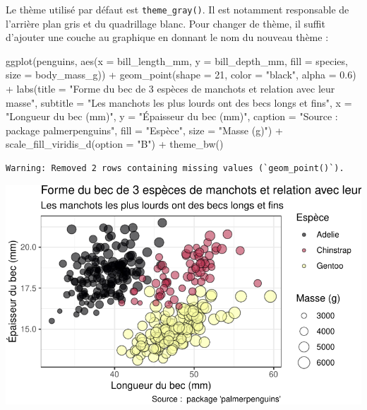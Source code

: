 \documentclass[
  a4paper,
  DIV=11,
  numbers=noendperiod,
  oneside]{scrreprt}
\newenvironment{Shaded}{}{}
\newcommand{\AttributeTok}[1]{\textcolor[rgb]{0.84,0.23,0.29}{#1}}
\newcommand{\DecValTok}[1]{\textcolor[rgb]{0.00,0.36,0.77}{#1}}
\newcommand{\FloatTok}[1]{\textcolor[rgb]{0.00,0.36,0.77}{#1}}
\newcommand{\FunctionTok}[1]{\textcolor[rgb]{0.44,0.26,0.76}{#1}}
\newcommand{\NormalTok}[1]{\textcolor[rgb]{0.14,0.16,0.18}{#1}}
\newcommand{\SpecialCharTok}[1]{\textcolor[rgb]{0.00,0.36,0.77}{#1}}
\newcommand{\StringTok}[1]{\textcolor[rgb]{0.01,0.18,0.38}{#1}}
\begin{document}
Le thème utilisé par défaut est \texttt{theme\_gray()}. Il est notamment
responsable de l'arrière plan gris et du quadrillage blanc. Pour changer
de thème, il suffit d'ajouter une couche au graphique en donnant le nom
du nouveau thème :

\begin{Shaded}
\begin{Highlighting}[]
\FunctionTok{ggplot}\NormalTok{(penguins, }\FunctionTok{aes}\NormalTok{(}\AttributeTok{x =}\NormalTok{ bill\_length\_mm, }\AttributeTok{y =}\NormalTok{ bill\_depth\_mm,}
                     \AttributeTok{fill =}\NormalTok{ species, }\AttributeTok{size =}\NormalTok{ body\_mass\_g)) }\SpecialCharTok{+}
  \FunctionTok{geom\_point}\NormalTok{(}\AttributeTok{shape =} \DecValTok{21}\NormalTok{, }\AttributeTok{color =} \StringTok{"black"}\NormalTok{, }\AttributeTok{alpha =} \FloatTok{0.6}\NormalTok{) }\SpecialCharTok{+}
  \FunctionTok{labs}\NormalTok{(}\AttributeTok{title =} \StringTok{"Forme du bec de 3 espèces de manchots et relation avec leur masse"}\NormalTok{,}
       \AttributeTok{subtitle =} \StringTok{"Les manchots les plus lourds ont des becs longs et fins"}\NormalTok{,}
       \AttributeTok{x =} \StringTok{"Longueur du bec (mm)"}\NormalTok{,}
       \AttributeTok{y =} \StringTok{"Épaisseur du bec (mm)"}\NormalTok{,}
       \AttributeTok{caption =} \StringTok{"Source :  package \textquotesingle{}palmerpenguins\textquotesingle{}"}\NormalTok{,}
       \AttributeTok{fill =} \StringTok{"Espèce"}\NormalTok{,}
       \AttributeTok{size =} \StringTok{"Masse (g)"}\NormalTok{) }\SpecialCharTok{+}
  \FunctionTok{scale\_fill\_viridis\_d}\NormalTok{(}\AttributeTok{option =} \StringTok{"B"}\NormalTok{) }\SpecialCharTok{+}
  \FunctionTok{theme\_bw}\NormalTok{()}
\end{Highlighting}
\end{Shaded}

\begin{verbatim}
Warning: Removed 2 rows containing missing values (`geom_point()`).
\end{verbatim}

\includegraphics{03-visualization_files/figure-pdf/unnamed-chunk-109-1.pdf}
\end{document}
